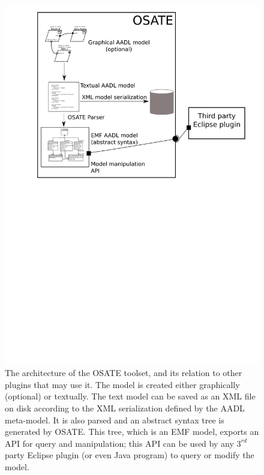 \begin{figure}
\centering
\includegraphics[scale=0.9]{figs/osate_arch}
\caption{The architecture of the OSATE toolset, and its relation to
  other plugins that may use it. The model is created either
  graphically (optional) or textually. The text model can be saved as
  an XML file on disk according to the XML serialization defined by
  the AADL meta-model. It is also parsed and an abstract syntax tree
  is generated by OSATE. This tree, which is an EMF model, exports an
  API for query and manipulation; this API can be used by any $3^{rd}$
  party Eclipse plugin (or even Java program) to query or modify the
  model.}
\label{fig:osate_arch}
\end{figure}

